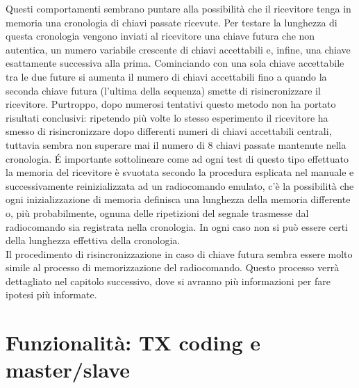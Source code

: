 Questi comportamenti sembrano puntare alla possibilità che il ricevitore tenga in memoria una cronologia di chiavi passate ricevute. Per testare la lunghezza di questa cronologia vengono inviati al ricevitore una chiave futura che non autentica, un numero variabile crescente di chiavi accettabili e, infine, una chiave esattamente successiva alla prima. Cominciando con una sola chiave accettabile tra le due future si aumenta il numero di chiavi accettabili fino a quando la seconda chiave futura (l’ultima della sequenza) smette di risincronizzare il ricevitore. Purtroppo, dopo numerosi tentativi questo metodo non ha portato risultati conclusivi: ripetendo più volte lo stesso esperimento il ricevitore ha smesso di risincronizzare dopo differenti numeri di chiavi accettabili centrali, tuttavia sembra non superare mai il numero di 8 chiavi passate mantenute nella cronologia. É importante sottolineare come ad ogni test di questo tipo effettuato la memoria del ricevitore è svuotata secondo la procedura esplicata nel manuale e successivamente reinizializzata ad un radiocomando emulato, c’è la possibilità che ogni inizializzazione di memoria definisca una lunghezza della memoria differente o, più probabilmente, ognuna delle ripetizioni del segnale trasmesse dal radiocomando sia registrata nella cronologia. In ogni caso non si può essere certi della lunghezza effettiva della cronologia.\\
Il procedimento di risincronizzazione in caso di chiave futura sembra essere molto simile al processo di memorizzazione del radiocomando. Questo processo verrà dettagliato nel capitolo successivo, dove si avranno più informazioni per fare ipotesi più informate.\\

\section{Funzionalità: TX coding e master/slave}
\label{sec:func}

